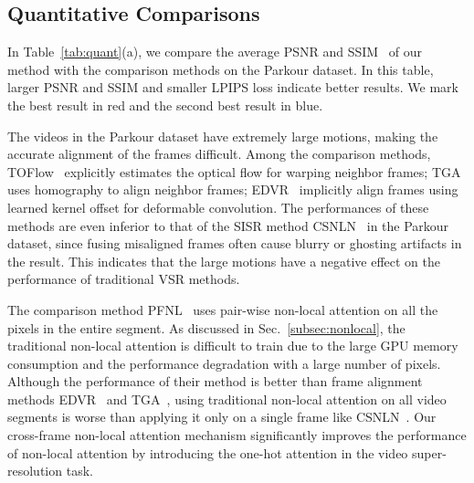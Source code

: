 \subsection{Quantitative Comparisons}\label{subsec:quant}
In Table~\ref{tab:quant}(a), we compare the average PSNR and SSIM~\cite{ssim} of our method with the comparison methods on the Parkour dataset.
In this table, larger PSNR and SSIM and smaller LPIPS loss indicate better results.
We mark the best result in red and the second best result in blue.

The videos in the Parkour dataset have extremely large motions, making the accurate alignment of the frames difficult.
Among the comparison methods, TOFlow~\cite{vimeo90k} explicitly estimates the optical flow for warping neighbor frames; TGA~\cite{tga} uses homography to align neighbor frames; EDVR~\cite{edvr} implicitly align frames using learned kernel offset for deformable convolution.
The performances of these methods are even inferior to that of the SISR method CSNLN~\cite{mei} in the Parkour dataset, since fusing misaligned frames often cause blurry or ghosting artifacts in the result.
This indicates that the large motions have a negative effect on the performance of traditional VSR methods.

The comparison method PFNL~\cite{pfnl} uses pair-wise non-local attention on all the pixels in the entire segment.
As discussed in Sec.~\ref{subsec:nonlocal}, the traditional non-local attention is difficult to train due to the large GPU memory consumption and the performance degradation with a large number of pixels.
Although the performance of their method is better than frame alignment methods EDVR~\cite{edvr} and TGA~\cite{tga}, using traditional non-local attention on all video segments is worse than applying it only on a single frame like CSNLN~\cite{mei}.
Our cross-frame non-local attention mechanism significantly improves the performance of non-local attention by introducing the one-hot attention in the video super-resolution task.

